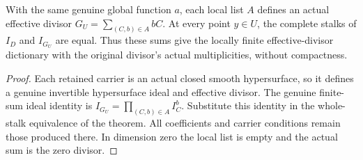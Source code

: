 \begin{corollary}
\label{hir:locally-finite-actual-divisor-sum-stalks}
\leanok
With the same genuine global function $a$, each local list $A$ defines
an actual effective divisor $G_U=\sum_{(C,b)\in A}bC$.  At every point
$y\in U$, the complete stalks of $I_D$ and $I_{G_U}$ are equal.
Thus these sums give the locally finite effective-divisor dictionary
with the original divisor's actual multiplicities, without compactness.
\end{corollary}
\begin{proof}
Each retained carrier is an actual closed smooth hypersurface, so it
defines a genuine invertible hypersurface ideal and effective divisor.
The genuine finite-sum ideal identity is
$I_{G_U}=\prod_{(C,b)\in A}I_C^b$.  Substitute this identity in the
whole-stalk equivalence of the theorem.  All coefficients and carrier
conditions remain those produced there.  In dimension zero the local
list is empty and the actual sum is the zero divisor.
\end{proof}

